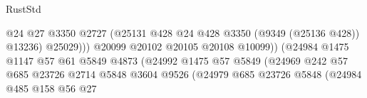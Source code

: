 \begin{lexlean}{RustStd}
\begin{coremodule}
{\begin{coremodule}
{{{{{{{{{{{{{{{{{{{{{{{{{{{{{{{{{{{{{{{                                                      @24
                                                      @27
                                                      @3350
                                                      @2727
                                                      (@25131
                                                        @428
                                                        @24
                                                        @428
                                                        @3350
                                                        (@9349 (@25136 @428))
                                                        @13236)
                                                      @25029)))
                                                @20099
                                                @20102
                                                @20105
                                                @20108
                                                @10099))
                                            (@24984
                                              @1475
                                              @1147
                                              @57
                                              @61
                                              @5849
                                              @4873
                                              (@24992
                                                @1475
                                                @57
                                                @5849
                                                (@24969
                                                  @242
                                                  @57
                                                  @685
                                                  @23726
                                                  @2714
                                                  @5848
                                                  @3604
                                                  @9526
                                                  (@24979
                                                    @685
                                                    @23726
                                                    @5848
                                                    (@24984
                                                      @485
                                                      @158
                                                      @56
                                                      @27
}}}}}}}}}}}}}}}}}}}}}}}}}}}}}}}}}}}}}}}
\end{coremodule}}
\end{coremodule}
\end{lexlean}
